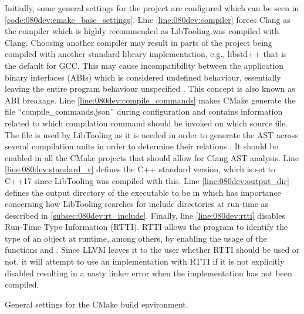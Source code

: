 Initially, some general settings for the project are configured which can be seen in \cref{code:080dev:cmake_base_settings}.
Line \ref{line:080dev:compiler} forces Clang as the compiler which is highly recommended as LibTooling was compiled with Clang. Choosing another compiler may result in parts of the project being compiled with another standard library implementation, e.g., libstd++ that is the default for GCC. This may cause incompatibility between the application binary interfaces (ABIs) which is considered undefined behaviour, essentially leaving the entire program behaviour unspecified \cite{cppreferenceUndefinedBehaviorCppreference}. This concept is also known as ABI breakage.
Line \ref{line:080dev:compile_commands} makes CMake generate the file ``compile\_commands.json'' during configuration and contains information related to which compilation command should be invoked on which source file. 
The file is used by LibTooling as it is needed in order to generate the AST across several compilation units in order to determine their relations \cite{JSONCompilationDatabase}. It should be enabled in all the CMake projects that should allow for Clang AST analysis.
Line \ref{line:080dev:standard_v} defines the C++ standard version, which is set to C++17 since LibTooling was compiled with this.
Line \ref{line:080dev:output_dir} defines the output directory of the executable to be in  which has importance concerning how LibTooling searches for include directories at run-time as described in \cref{subsec:080dev:rt_include}.
Finally, line \ref{line:080dev:rtti} disables Run-Time Type Information (RTTI). RTTI allows the program to identify the type of an object at runtime, among others, by enabling the usage of the functions  and . Since LLVM leaves it to the user whether RTTI should be used or not, it will attempt to use an implementation with RTTI if it is not explicitly disabled resulting in a nasty linker error when the implementation has not been compiled.

\begin{listing}[H]
    \caption{General settings for the CMake build environment.}
    \label{code:080dev:cmake_base_settings}
\end{listing}

